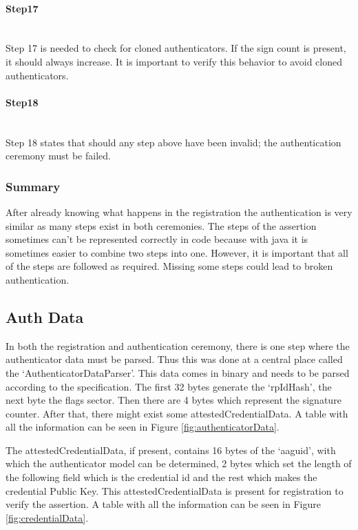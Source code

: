 \documentclass[a4paper, 11pt]{scrartcl}
\begin{document}
\paragraph{Step17}\hfill \\ 
Step 17 is needed to check for cloned authenticators. If the sign count is present, it should always increase. It is important to verify this behavior to avoid cloned authenticators.

\paragraph{Step18}\hfill \\ 
Step 18 states that should any step above have been invalid; the authentication ceremony must be failed.

\subsubsection{Summary}
After already knowing what happens in the registration the authentication is very similar as many steps exist in both ceremonies. The steps of the assertion sometimes can't be represented correctly in code because with java it is sometimes easier to combine two steps into one. However, it is important that all of the steps are followed as required. Missing some steps could lead to broken authentication.

\subsection{Auth Data}
\label{sec:authData}
In both the registration and authentication ceremony, there is one step where the authenticator data must be parsed. Thus this was done at a central place called the `AuthenticatorDataParser'. This data comes in binary and needs to be parsed according to the specification. The first 32 bytes generate the `rpIdHash', the next byte the flags sector. Then there are 4 bytes which represent the signature counter. After that, there might exist some attestedCredentialData. A table with all the information can be seen in Figure \ref{fig:authenticatorData}.

The attestedCredentialData, if present, contains 16 bytes of the `aaguid', with which the authenticator model can be determined, 2 bytes which set the length of the following field which is the credential id and the rest which makes the credential Public Key. This attestedCredentialData is present for registration to verify the assertion. A table with all the information can be seen in Figure \ref{fig:credentialData}.
\end{document}
